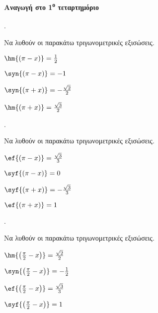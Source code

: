 \documentclass[11pt,a4paper,twocolumn]{article}
\newcounter{askhsh}
\newcommand{\askhsh}{\large\theaskhsh.\ \addtocounter{askhsh}{1}}
\newcommand{\tss}[1]{\textsuperscript{#1}}
\begin{document}
\paragraph{Αναγωγή στο 1\tss{ο} τεταρτημόριο}
\askhsh 
Να λυθούν οι παρακάτω τριγωνομετρικές εξισώσεις.
\begin{alist}
\item $ \hm{\left( \pi-x\right) }=\frac{1}{2} $
\item $ \syn{\left(\pi-x\right) }=-1 $
\item $ \syn{\left(\pi+x\right) }=-\frac{\sqrt{2}}{2} $
\item $ \hm{\left(\pi+x \right) }=\frac{\sqrt{3}}{2} $
\end{alist}
\askhsh 
Να λυθούν οι παρακάτω τριγωνομετρικές εξισώσεις.
\begin{alist}
\item $ \ef{\left( \pi-x\right) }=\frac{\sqrt{3}}{3} $
\item $ \syf{\left(\pi-x\right) }=0 $
\item $ \syf{\left(\pi+x\right) }=-\frac{\sqrt{3}}{3} $
\item $ \ef{\left(\pi+x \right) }=1 $
\end{alist}
\askhsh 
Να λυθούν οι παρακάτω τριγωνομετρικές εξισώσεις.
\begin{alist}
\item $ \hm{\left( \frac{\pi}{2}-x\right) }=\frac{\sqrt{2}}{2} $
\item $ \syn{\left(\frac{\pi}{2}-x\right) }=-\frac{1}{2} $
\item $ \ef{\left(\frac{\pi}{2}-x\right) }=\frac{\sqrt{3}}{3} $
\item $ \syf{\left(\frac{\pi}{2}-x \right) }=1 $
\end{alist}
\end{document}
